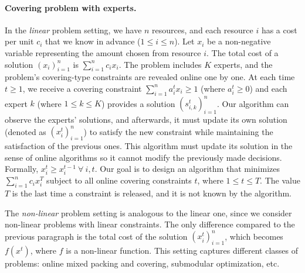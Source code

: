\paragraph{Covering problem with experts.}
In the \emph{linear} problem setting, we have $n$ resources, and each resource $i$ has a cost per unit $c_{i}$ that we know in advance ($1 \leq i \leq n$).
Let $x_{i}$ be a non-negative variable representing the amount chosen from resource $i$.
The total cost of a solution $(x_{i})_{i=1}^{n}$ is $\sum_{i=1}^{n} c_{i} x_{i}$.
The problem includes $K$ experts, and the problem's covering-type constraints are revealed online one by one.
At each time $t \geq 1$, we receive a covering constraint $\sum_{i=1}^{n} a_{i}^{t} x_{i} \geq 1$ (where $a_{i}^{t} \geq 0$) and each expert $k$ (where $1 \leq k \leq K$) provides
a solution $(s_{i,k}^{t})_{i=1}^{n}$. Our algorithm can observe the experts' solutions, and afterwards, it must update its own solution (denoted as $(x_{i}^{t})_{i=1}^{n}$)
to satisfy the new constraint while maintaining the satisfaction of the previous ones. This algorithm must update its solution in the sense of online algorithms so it cannot modify the previously made decisions. Formally, $x_{i}^{t} \geq x_{i}^{t-1} ~\forall\ i, t$.
Our goal is to design an algorithm that minimizes $\sum_{i=1}^{n} c_{i} x_{i}^{T}$ subject to
all online covering constraints $t$, where $1 \leq t \leq T$. The value $T$ is the last time a constraint is released, and it is not known by the algorithm.

The \emph{non-linear} problem setting is analogous to the linear one, since we consider non-linear problems with linear constraints. The only difference compared to the previous paragraph is the total cost of the solution $(x_{i}^t)_{i=1}^{n}$, which becomes $f(x^t)$, where $f$ is a non-linear function. This setting captures different classes of problems: online mixed packing and covering, submodular optimization, etc.

